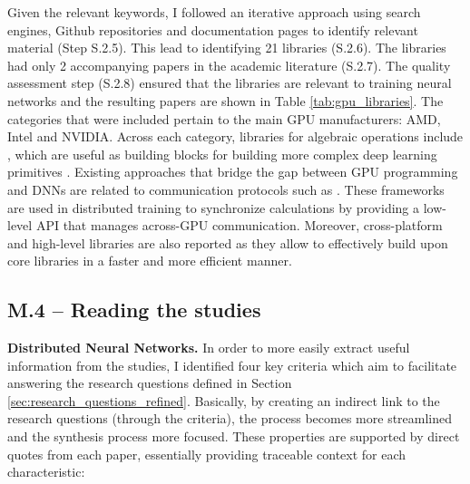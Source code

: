 Given the relevant keywords, I followed an iterative approach using search engines, Github
repositories and documentation pages to identify relevant material (Step S.2.5). This lead to
identifying 21 libraries (S.2.6). The libraries had only 2 accompanying papers
\cite{chetlur_cudnn_2014,okuta_cupy_2017} in the academic literature (S.2.7). The quality
assessment step (S.2.8) ensured that the libraries are relevant to training neural networks and the
resulting papers are shown in Table \ref{tab:gpu_libraries}. The categories that were included
pertain to the main GPU manufacturers: AMD, Intel and NVIDIA. Across each category, libraries for
algebraic operations include \cite{noauthor_cublas_nodate,noauthor_rocmrocblas_2025,
	noauthor_uxlfoundationonemath_2025}, which are useful as building blocks for building more complex
deep learning primitives
\cite{chetlur_cudnn_2014,noauthor_rocmmiopen_2025,onednn_contributors_oneapi_2025}. Existing
approaches that bridge the gap between GPU programming and DNNs are related to communication
protocols such as
\cite{noauthor_nvidianccl_2025,noauthor_rocmrccl_2025,noauthor_uxlfoundationoneccl_2025}. These
frameworks are used in distributed training to synchronize calculations by providing a low-level
API that manages across-GPU communication. Moreover, cross-platform and high-level libraries are
also reported as they allow to effectively build upon core libraries in a faster and more efficient
manner.

\subsection{M.4 -- Reading the studies}
\label{sec:reading-studies}
\textbf{Distributed Neural Networks.}
In order to more easily extract useful information from the studies, I identified four key criteria
which aim to facilitate answering the research questions defined in Section \ref{sec:research_questions_refined}.
Basically, by creating an indirect link to the research questions (through the criteria), the process becomes more
streamlined and the synthesis process more focused. These properties are supported by direct quotes from each paper,
essentially providing traceable context for each characteristic:

